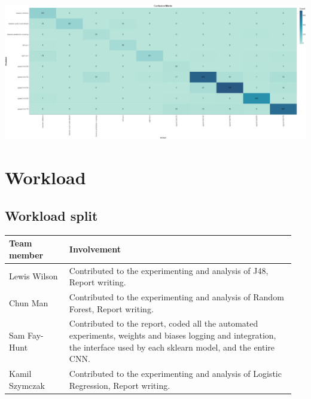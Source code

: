 \documentclass[11pt]{article}
\begin{document}
\begin{center}
  \includegraphics [width = \textwidth, height = 0.5\textheight, keepaspectratio]{Images/LRConfMat.png}
\end{center}

\pagebreak
\appendix
\appendixpage
\addappheadtotoc

\section{Workload}


\subsection{Workload split}
  
  \begin{table}[ht]
    \centering
    \begin{tabular}{|p{0.2\linewidth} | p{0.75\linewidth}|} 
      \hline
      \textbf{Team member}  & \textbf{Involvement} \\ \hline
      Lewis Wilson & Contributed to the experimenting and analysis of J48, Report writing. \\ \hline
      Chun Man & Contributed to the experimenting and analysis of Random Forest, Report writing. \\ \hline
      Sam Fay-Hunt & Contributed to the report, coded all the automated experiments, weights and biases logging and integration, the interface used by each sklearn model, and the entire CNN. \\ \hline
      Kamil Szymczak & Contributed to the experimenting and analysis of Logistic Regression, Report writing. \\ \hline
    \end{tabular}
  \end{table}\label{ContributionTab}
\end{document}
